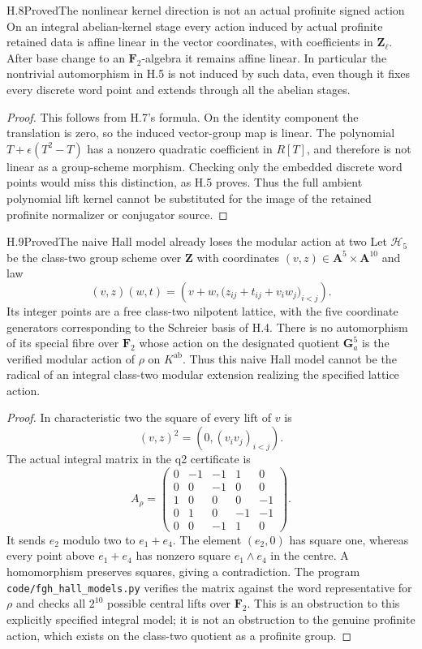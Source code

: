 \begin{statement}{H.8}{Proved}{The nonlinear kernel direction is not an actual profinite signed action}
On an integral abelian-kernel stage every action induced by actual
profinite retained data is affine linear in the vector coordinates,
with coefficients in $\mathbf Z_\ell$. After base change to an
$\mathbf F_2$-algebra it remains affine linear. In particular the
nontrivial automorphism in H.5 is not induced by such data, even
though it fixes every discrete word point and extends through all
the abelian stages.
\end{statement}
\begin{proof}
This follows from H.7's formula. On the identity component the
translation is zero, so the induced vector-group map is linear.
The polynomial $T+\epsilon(T^2-T)$ has a nonzero quadratic
coefficient in $R[T]$, and therefore is not linear as a group-scheme
morphism. Checking only the embedded discrete word points would
miss this distinction, as H.5 proves. Thus the full ambient
polynomial lift kernel cannot be substituted for the image of
the retained profinite normalizer or conjugator source.
\end{proof}

\begin{statement}{H.9}{Proved}{The naive Hall model already loses the modular action at two}
Let $\mathscr H_5$ be the class-two group scheme over $\mathbf Z$
with coordinates $(v,z)\in\mathbf A^5\times\mathbf A^{10}$ and law
\[
 (v,z)(w,t)=\left(v+w,
       \bigl(z_{ij}+t_{ij}+v_iw_j\bigr)_{i<j}\right).
\]
Its integer points are a free class-two nilpotent lattice, with the
five coordinate generators corresponding to the Schreier basis of
H.4. There is no automorphism of its special fibre over $\mathbf F_2$
whose action on the designated quotient $\mathbf G_a^5$ is the
verified modular action of $\rho$ on $K^{\mathrm{ab}}$.
Thus this naive Hall model cannot be the radical of an integral
class-two modular extension realizing the specified lattice action.
\end{statement}
\begin{proof}
In characteristic two the square of every lift of $v$ is
\[
              (v,z)^2=(0,(v_iv_j)_{i<j}).
\]
The actual integral matrix in the q2 certificate is
\[
 A_\rho=\begin{pmatrix}
 0&-1&-1&1&0\\
 0&0&-1&0&0\\
 1&0&0&0&-1\\
 0&1&0&-1&-1\\
 0&0&-1&1&0
 \end{pmatrix}.
\]
It sends $e_2$ modulo two to $e_1+e_4$. The element $(e_2,0)$
has square one, whereas every point above $e_1+e_4$ has nonzero
square $e_1\wedge e_4$ in the centre. A homomorphism preserves
squares, giving a contradiction. The program
\texttt{code/fgh\_hall\_models.py} verifies the matrix against the
word representative for $\rho$ and checks all $2^{10}$ possible
central lifts over $\mathbf F_2$.
This is an obstruction to this explicitly specified integral model;
it is not an obstruction to the genuine profinite action, which
exists on the class-two quotient as a profinite group.
\end{proof}

